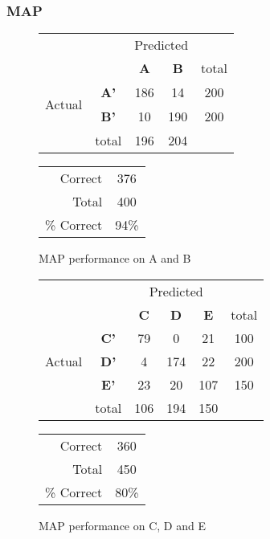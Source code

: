 \subsubsection{MAP}
\begin{figure}[ht]
\begin{minipage}[b]{0.5\linewidth}
\centering
	\begin{tabular}{ccc|c|c}
	 & &\multicolumn{2}{c}{Predicted} &\\
	  & & \bf{A} &  \bf{B} & total \\
	 \cline{3-5}
	 \multirow{2}{*}{\begin{sideways}Actual\end{sideways}} & \bf{A'}& 186 & 14 & 200 \\
	 \cline{3-5}
	 & \bf{B'}& 10 & 190 & 200 \\
	  \cline{3-5}
	 &total&196&204&\\
	\end{tabular}
\end{minipage}
\hspace{0.5cm}
\begin{minipage}[b]{0.5\linewidth}
	\begin{tabular}{r|c}
	\hline
	Correct& 376\\
	Total& 400\\
	\hline
	\% Correct& 94\%\\
	\hline
	\end{tabular}
\end{minipage}
\vspace{1mm}
\caption{MAP performance on A and B}
\end{figure}


\begin{figure}[ht]
\begin{minipage}[b]{0.5\linewidth}
\centering
	\begin{tabular}{ccc|c|c|c}
	 & &\multicolumn{3}{c}{Predicted} &\\
	  & & \bf{C} &  \bf{D} & \bf{E} & total \\
	 \cline{3-5}
	 \multirow{3}{*}{\begin{sideways}Actual\end{sideways}} & \bf{C'}& 79 & 0 & 21 & 100\\
	 \cline{3-6}
	 & \bf{D'}& 4 & 174 & 22 & 200\\
	  \cline{3-6}
	 & \bf{E'}& 23 & 20 & 107 &  150\\
	  \cline{3-6}
	 &total&106&194&150\\
	\end{tabular}
\end{minipage}
\hspace{0.5cm}
\begin{minipage}[b]{0.5\linewidth}
	\begin{tabular}{r|c}
	\hline
	Correct& 360\\
	Total& 450\\
	\hline
	\% Correct& 80\%\\
	\hline
	\end{tabular}
\end{minipage}
\vspace{1mm}
\caption{MAP performance on C, D and E}
\end{figure}


